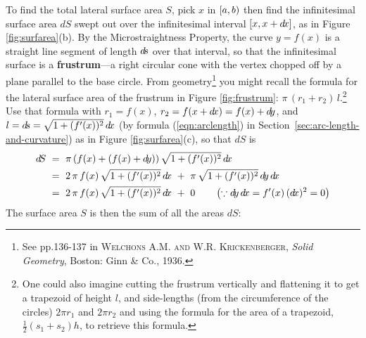 \piccaption[]{\label{fig:frustrum}}
\noindent To find the total lateral surface area $S$, pick $x$ in
$\lbrack a,b )$ then find the infinitesimal surface area $d\!S$ swept out over
the infinitesimal interval $\lbrack x,x+d\!x \rbrack$, as in Figure \ref{fig:surfarea}(b).
By the Microstraightness Property, the curve $y=f(x)$ is a straight line segment
of length $d\!s$ over that interval, so that the infinitesimal surface is a
\textbf{frustrum}---a right circular cone with the vertex chopped off by a plane
parallel to the base circle. From geometry\footnote{See pp.136-137 in
\textsc{Welchons A.M. and W.R. Krickenberger}, \emph{Solid Geometry}, Boston:
Ginn \& Co., 1936.} you might recall the formula for the lateral surface area of
the frustrum in Figure \ref{fig:frustrum}:
$\pi\,(r_1+r_2)\,l$.\footnote{One could also imagine cutting the
frustrum vertically and flattening it to get a trapezoid of height
$l$, and side-lengths (from the circumference of the circles)
$2 \pi r_1$ and $2 \pi r_2$ and using the formula for the area of
a trapezoid, $\frac{1}{2}(s_1+s_2)h$, to retrieve this
formula.}
Use that formula with $r_1=f(x)$, $r_2=f(x+d\!x)=f(x)+d\!y$, and
$l=d\!s=\sqrt{1 + (f'(x))^2}\,d\!x$ (by formula (\ref{eqn:arclength}) in Section~\ref{sec:arc-length-and-curvature})
as in Figure \ref{fig:surfarea}(c), so that $d\!S$ is
\begin{align*}
d\!S ~&=~ \pi\,(f(x) + (f(x)+\dy))\,\sqrt{1 + (f'(x))^2}\,\dx\\
&=~ 2\,\pi\,f(x)\,\sqrt{1 + (f'(x))^2}\,\dx ~+~ \pi\,\sqrt{1 + (f'(x))^2}\,\dy\,\dx\\
&=~ 2\,\pi\,f(x)\,\sqrt{1 + (f'(x))^2}\,\dx ~+~ 0 \qquad\left(\because \dy\,\dx = f'(x)\,(\dx)^2 = 0\right)
\end{align*}
The surface area $S$ is then the sum of all the areas $d\!S$:


